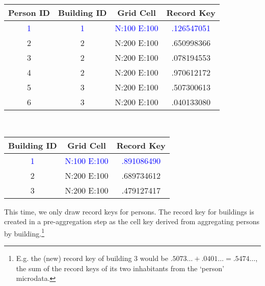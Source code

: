 \begin{table}[H]
    \centering
    \begin{tabular}{| c | c | c | c |}
    \hline
        Person ID & Building ID & Grid Cell & Record Key \\
    \hline
            \textcolor{blue}{1} & \textcolor{blue}{1} & \textcolor{blue}{N:100 E:100} & \textcolor{blue}{.126547051} \\
    \hline
            2     &   2      &     N:200 E:100     & .650998366 \\
    \hline
            3     &   2      &     N:200 E:100     & .078194553 \\
    \hline
            4     &   2      &     N:200 E:100     & .970612172 \\
    \hline
            5     &   3      &     N:200 E:100     & .507300613 \\
    \hline
            6     &   3      &     N:200 E:100     & .040133080 \\
    \hline
    \end{tabular}\\ \vspace{10pt}
    \begin{tabular}{| c | c | c |}
    \hline
        Building ID & Grid Cell & Record Key \\
    \hline
          \textcolor{blue}{1} & \textcolor{blue}{N:100 E:100} & \textcolor{blue}{.891086490} \\
    \hline
          2      &    N:200 E:100      & .689734612 \\
    \hline
          3      &    N:200 E:100      & .479127417 \\
    \hline
    \end{tabular}
\end{table}

This time, we only draw record keys for persons. The record key for buildings is created in a pre-aggregation step as the cell key derived from aggregating persons by building.\footnote{
    E.g. the (new) record key of building 3 would be $.5073\ldots + .0401\ldots = .5474\ldots$, the sum of the record keys of its two inhabitants from the `person' microdata.
}

